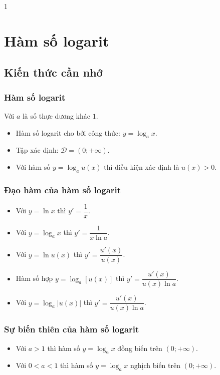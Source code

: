 \setcounter {section} {1}
\setcounter{ex}{0}
\section{Hàm số logarit}
\subsection{Kiến thức cần nhớ}
\begin{khung}
	\subsubsection{Hàm số logarit}
		Với $a$ là số thực dương khác $1$.
		\begin{itemize}
			\item Hàm số logarit cho bởi công thức: $y=\log_a{x}$.
			\item Tập xác định: $\mathscr{D}=(0;+\infty)$.
			\item Với hàm số $y=\log_a{u(x)}$ thì điều kiện xác định là $u(x)>0$.
		\end{itemize}
	\subsubsection{Đạo hàm của hàm số logarit}
		\begin{itemize}
			\item Với $y=\ln x$ thì $y'=\dfrac{1}{x}$.
			\item Với $y=\log_ax$ thì $y'=\dfrac{1}{x\ln a}$.
			\item Với $y=\ln u(x)$ thì $y'=\dfrac{u'(x)}{u(x)}$.
			\item Hàm số hợp $y=\log_a\left[u(x)\right]$ thì $y'=\dfrac{u'(x)}{u(x)\ln a}$.
			\item Với $y=\log_a\left|u(x)\right|$ thì $y'=\dfrac{u'(x)}{u(x)\ln a}$.
		\end{itemize}
			
	\subsubsection{Sự biến thiên của hàm số logarit}
		\begin{itemize}
			\item Với $a>1$ thì hàm số $y=\log_ax$ đồng biến trên $(0;+\infty)$.
			\item Với $0<a<1$ thì hàm số $y=\log_ax$ nghịch biến trên $(0;+\infty)$.
		\end{itemize}
	

\end{khung}
